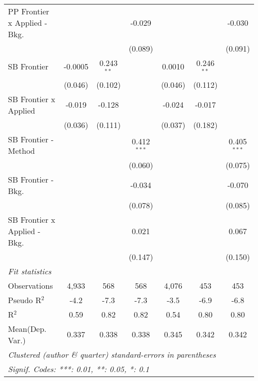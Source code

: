 \begin{tabular}{lcccccc}
   PP Frontier x Applied - Bkg.   &         &              & -0.029         &              &              & -0.030\\   
                                  &         &              & (0.089)        &              &              & (0.091)\\   
   SB Frontier                    & -0.0005 & 0.243$^{**}$ &                & 0.0010       & 0.246$^{**}$ &   \\   
                                  & (0.046) & (0.102)      &                & (0.046)      & (0.112)      &   \\   
   SB Frontier x Applied          & -0.019  & -0.128       &                & -0.024       & -0.017       &   \\   
                                  & (0.036) & (0.111)      &                & (0.037)      & (0.182)      &   \\   
   SB Frontier - Method           &         &              & 0.412$^{***}$  &              &              & 0.405$^{***}$\\   
                                  &         &              & (0.060)        &              &              & (0.075)\\   
   SB Frontier - Bkg.             &         &              & -0.034         &              &              & -0.070\\   
                                  &         &              & (0.078)        &              &              & (0.085)\\   
   SB Frontier x Applied - Bkg.   &         &              & 0.021          &              &              & 0.067\\   
                                  &         &              & (0.147)        &              &              & (0.150)\\   
   \midrule
   \emph{Fit statistics}\\
   Observations                   & 4,933   & 568          & 568            & 4,076        & 453          & 453\\  
   Pseudo R$^2$                   & -4.2    & -7.3         & -7.3           & -3.5         & -6.9         & -6.8\\  
   R$^2$                          & 0.59    & 0.82         & 0.82           & 0.54         & 0.80         & 0.80\\  
Mean(Dep. Var.) & 0.337 & 0.338 & 0.338 & 0.345 & 0.342 & 0.342 \\
   \midrule \midrule
   \multicolumn{7}{l}{\emph{Clustered (author \& quarter) standard-errors in parentheses}}\\
   \multicolumn{7}{l}{\emph{Signif. Codes: ***: 0.01, **: 0.05, *: 0.1}}\\
\end{tabular}
\par\endgroup
